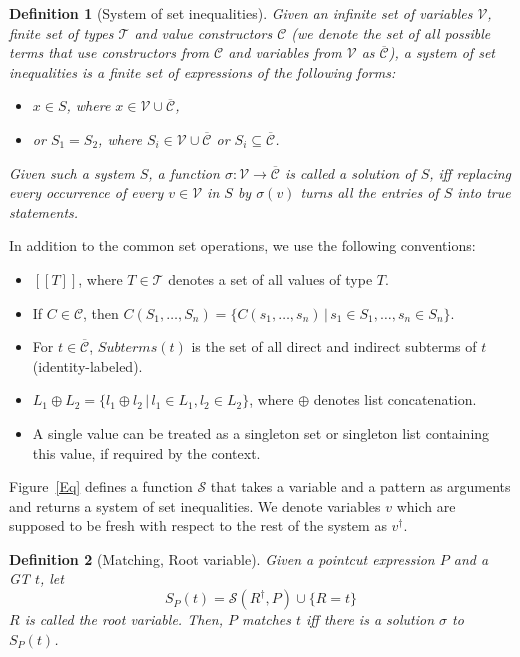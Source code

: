 \documentclass{IOS-Book-Article}     %
\newcommand{\sem}[1]{[\![#1]\!]}
\newcommand{\fresh}[1]{#1^\dagger}
\newcommand{\Eq}{\mathcal{S}}
\newtheorem{Def}{Definition}
\newcommand{\figref}[1]{Figure~\ref{#1}}
\begin{document}
\begin{Def}[System of set inequalities]
Given an infinite set of variables $\mathcal{V}$, finite set of types $\mathcal{T}$ and value constructors $\mathcal{C}$ (we denote the set of all possible terms that use constructors from $\mathcal{C}$ and variables from $\mathcal{V}$ as $\overline{\mathcal{C}}$),
a \emph{system of set inequalities} is a finite set of expressions of the following forms:
\begin{itemize}
\item $x \in S$, where $x \in \mathcal{V} \cup \overline{\mathcal{C}}$, 
\item or $S_1 = S_2$, where $S_i \in \mathcal{V} \cup \overline{\mathcal{C}}$ or $S_i \subseteq \overline{\mathcal{C}}$.
\end{itemize}
Given such a system $S$, a function $\sigma : \mathcal{V}  \rightarrow \overline{\mathcal{C}}$ is called a \emph{solution} of $S$, iff replacing every occurrence of every $v \in \mathcal{V}$ in $S$ by $\sigma(v)$ turns all the entries of $S$ into true statements.
\end{Def}
In addition to the common set operations, we use the following conventions:
\begin{itemize}
	\item $\sem{T}$, where $T \in \mathcal{T}$ denotes a set of all values of type $T$.
	\item If $C \in \mathcal{C}$, then $C(S_1, \ldots, S_n) = \{C(s_1, \ldots, s_n) \,|\, s_1 \in S_1, \ldots, s_n \in S_n\}$.
	\item For $t \in \overline{\mathcal{C}}$, $Subterms(t)$ is the set of all direct and indirect subterms of $t$ (identity-labeled).
	\item $L_1 \oplus L_2 = \{l_1 \oplus l_2 \,|\, l_1 \in L_1, l_2 \in L_2\}$, where $\oplus$ denotes list concatenation.
	\item A single value can be treated as a singleton set or singleton list containing this value, if required by the context.
\end{itemize}

\figref{Eq} defines a function $\Eq{}$ that takes a variable and a pattern as arguments and returns a system of set inequalities. We denote variables $v$ which are supposed to be fresh with respect to the rest of the system as $\fresh{v}$. 
\begin{Def}[Matching, Root variable]\label{SPT}
Given a pointcut expression $P$ and a GT $t$, let 
$$S_P(t) = \Eq{}(\fresh{R}, P) \cup \{R = t\}$$
$R$ is called the \emph{root variable}. Then, $P$ \emph{matches} $t$ iff there is a solution $\sigma$ to $S_P(t)$.
\end{Def}
\end{document}
